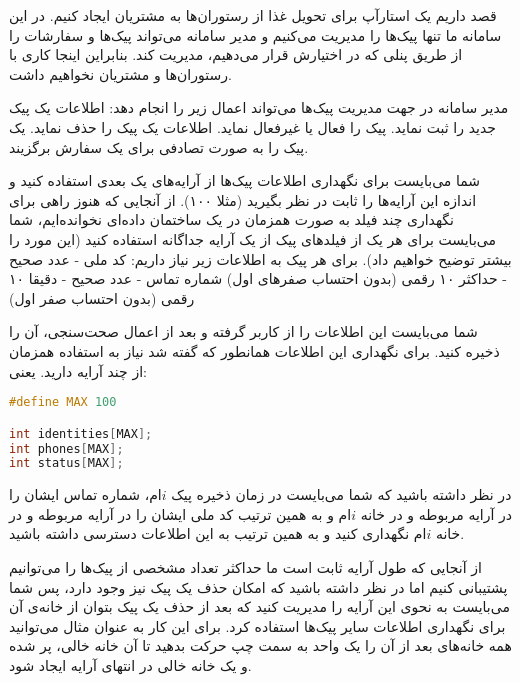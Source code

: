\documentclass[../main.tex]{subfiles}
\begin{document}

قصد داریم یک استارآپ برای تحویل غذا از رستوران‌ها به مشتریان ایجاد کنیم. در این سامانه ما تنها پیک‌ها را مدیریت می‌کنیم و مدیر سامانه می‌تواند پیک‌ها و سفارشات را از طریق پنلی که در اختیارش قرار می‌دهیم، مدیریت کند.
بنابراین اینجا کاری با رستوران‌ها و مشتریان نخواهیم داشت.

مدیر سامانه در جهت مدیریت پیک‌ها می‌تواند اعمال زیر را انجام دهد:
 اطلاعات یک پیک جدید را ثبت نماید.
 پیک را فعال یا غیرفعال نماید.
 اطلاعات یک پیک را حذف نماید.
 یک پیک را به صورت تصادفی برای یک سفارش برگزیند.

شما می‌بایست برای نگهداری اطلاعات پیک‌ها از آرایه‌های یک بعدی استفاده کنید و اندازه این آرایه‌ها را ثابت در نظر بگیرید (مثلا ۱۰۰). از آنجایی که هنوز راهی برای نگهداری چند فیلد به صورت همزمان در یک ساختمان داده‌ای نخوانده‌ایم، شما می‌بایست برای هر یک از فیلدهای پیک از یک آرایه جداگانه استفاده کنید (این مورد را بیشتر توضیح خواهیم داد).
برای هر پیک به اطلاعات زیر نیاز داریم:
 کد ملی - عدد صحیح - حداکثر ۱۰ رقمی (بدون احتساب صفرهای اول)
 شماره تماس - عدد صحیح - دقیقا ۱۰ رقمی (بدون احتساب صفر اول)

شما می‌بایست این اطلاعات را از کاربر گرفته و بعد از اعمال صحت‌سنجی، آن‌ را ذخیره کنید. برای نگهداری این اطلاعات همانطور که گفته شد نیاز به استفاده همزمان از چند آرایه دارید. یعنی:
\begin{latin}
\begin{lstlisting}[language=c]
#define MAX 100

int identities[MAX];
int phones[MAX];
int status[MAX];
\end{lstlisting}
\end{latin}

در نظر داشته باشید که شما می‌بایست در زمان ذخیره پیک $i$ام، شماره تماس ایشان را در آرایه مربوطه و در خانه $i$ام و به همین ترتیب کد ملی ایشان را در آرایه مربوطه و در خانه $i$ام نگهداری کنید و به همین ترتیب به این اطلاعات دسترسی داشته باشید.

از آنجایی که طول آرایه ثابت است ما حداکثر تعداد مشخصی از پیک‌ها را می‌توانیم پشتیبانی کنیم اما در نظر داشته باشید که امکان حذف یک پیک نیز وجود دارد، پس شما می‌بایست به نحوی این آرایه را مدیریت کنید که بعد از حذف یک پیک بتوان از خانه‌ی آن برای نگهداری اطلاعات سایر پیک‌ها استفاده کرد.
برای این کار به عنوان مثال می‌توانید همه خانه‌های بعد از آن را یک واحد به سمت چپ حرکت بدهید تا آن خانه خالی، پر شده و یک خانه خالی در انتهای آرایه ایجاد شود.
\end{document}
